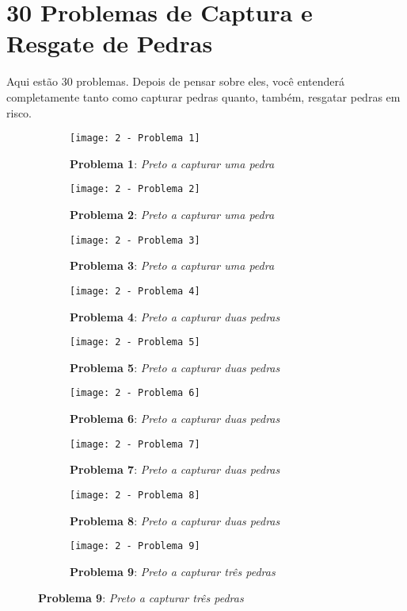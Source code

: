 \pagebreak

\section{30 Problemas de Captura e Resgate de Pedras}

Aqui estão 30 problemas. Depois de pensar sobre eles, você entenderá completamente tanto como capturar pedras quanto, também, resgatar pedras em risco.

\begin{figure}[h!]
    \centering
    \captionsetup{justification=raggedright,singlelinecheck=false}
    \begin{subfigure}[t]{.3\textwidth}
        \texttt{[image: 2 - Problema 1]}
        \caption*{\textbf{Problema 1}: \emph{Preto a capturar uma pedra}}
    \end{subfigure}
    \hfill
    \begin{subfigure}[t]{.3\textwidth}
        \texttt{[image: 2 - Problema 2]}
        \caption*{\textbf{Problema 2}: \emph{Preto a capturar uma pedra}}
    \end{subfigure}
    \hfill
    \begin{subfigure}[t]{.3\textwidth}
        \texttt{[image: 2 - Problema 3]}
        \caption*{\textbf{Problema 3}: \emph{Preto a capturar uma pedra}}
    \end{subfigure}
    \par\bigskip
    \begin{subfigure}[t]{.3\textwidth}
        \texttt{[image: 2 - Problema 4]}
        \caption*{\textbf{Problema 4}: \emph{Preto a capturar duas pedras}}
    \end{subfigure}
    \hfill
    \begin{subfigure}[t]{.3\textwidth}
        \texttt{[image: 2 - Problema 5]}
        \caption*{\textbf{Problema 5}: \emph{Preto a capturar duas pedras}}
    \end{subfigure}
    \hfill
    \begin{subfigure}[t]{.3\textwidth}
        \texttt{[image: 2 - Problema 6]}
        \caption*{\textbf{Problema 6}: \emph{Preto a capturar duas pedras}}
    \end{subfigure}
    \par\bigskip
    \begin{subfigure}[t]{.3\textwidth}
        \texttt{[image: 2 - Problema 7]}
        \caption*{\textbf{Problema 7}: \emph{Preto a capturar duas pedras}}
    \end{subfigure}
    \hfill
    \begin{subfigure}[t]{.3\textwidth}
        \texttt{[image: 2 - Problema 8]}
        \caption*{\textbf{Problema 8}: \emph{Preto a capturar duas pedras}}
    \end{subfigure}
    \hfill
    \begin{subfigure}[t]{.3\textwidth}
        \texttt{[image: 2 - Problema 9]}
        \caption*{\textbf{Problema 9}: \emph{Preto a capturar três pedras}}
    \end{subfigure}
\end{figure}

